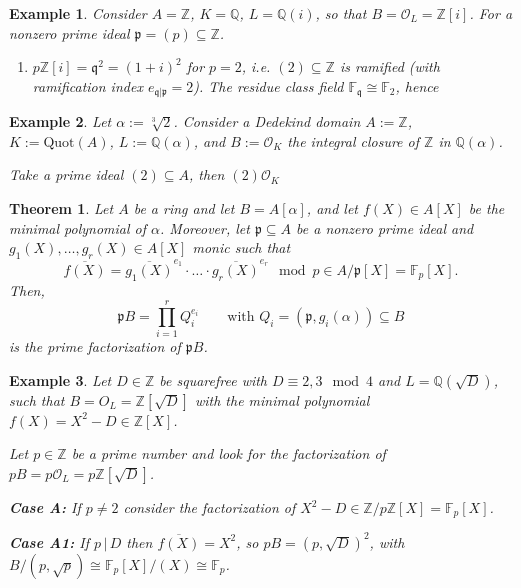 \documentclass[a4paper]{book}
\theoremstyle{break}
\newtheorem{example}{Example}
\theoremstyle{plain}
\newtheorem{theorem}{Theorem}[definition]
\begin{document}
\begin{example}
    Consider \(A = \mathbb{Z}\), \(K = \mathbb{Q}\), \(L = \mathbb{Q}(i)\), so that \(B = \mathcal{O}_L = \mathbb{Z}[i]\). For a nonzero prime ideal \(\mathfrak{p} = (p) \subseteq \mathbb{Z}\).
    \begin{enumerate}
        \item \(p \mathbb{Z}[i] = \mathfrak{q}^2 = (1 + i)^2\) for \(p = 2\), i.e. \((2) \subseteq \mathbb{Z}\) is ramified (with ramification index \(e_{\mathfrak{q} | \mathfrak{p}} = 2\)). The residue class field \(\mathbb{F}_\mathfrak{q} \cong \mathbb{F}_2\), hence
    \end{enumerate}
\end{example}

\begin{example}
    Let \(\alpha := \sqrt[3]{2}\). Consider a Dedekind domain \(A := \mathbb{Z}\), \(K := \text{Quot}(A)\), \(L := \mathbb{Q}(\alpha)\), and \(B := \mathcal{O}_K\) the integral closure of \(\mathbb{Z}\) in \(\mathbb{Q}(\alpha)\).

    Take a prime ideal \((2) \subseteq A\), then \((2) \mathcal{O}_K\)
\end{example}


\begin{theorem}
    Let \(A\) be a ring and let \(B = A[\alpha]\), and let \(f(X) \in A[X]\) be the minimal polynomial of \(\alpha\). Moreover, let \(\mathfrak{p} \subseteq A\) be a nonzero prime ideal and \(g_1(X), \ldots, g_r(X) \in A[X]\) monic such that
    \begin{equation}
        \overline{f(X)} = \overline{g_1(X)}^{e_1} \cdot \ldots \cdot \overline{g_r(X)}^{e_r} \mod{p} \in A / \mathfrak{p} [X] = \mathbb{F}_p [X] \text{.}
    \end{equation}
    Then,
    \begin{equation}
        \mathfrak{p}B = \prod_{i=1}^r Q_i^{e_i} \qquad \text{with } Q_i = (\mathfrak{p}, g_i(\alpha)) \subseteq B
    \end{equation}
    is the prime factorization of \(\mathfrak{p}B\).
\end{theorem}

\begin{example}
    Let \(D \in \mathbb{Z}\) be squarefree with \(D \equiv 2, 3 \mod{4}\) and \(L = \mathbb{Q}(\sqrt{D})\), such that \(B = O_L = \mathbb{Z}[\sqrt{D}]\) with the minimal polynomial \(f(X) = X^2 - D \in \mathbb{Z}[X]\).

    Let \(p \in \mathbb{Z}\) be a prime number and look for the factorization of \(pB = p \mathcal{O}_L = p \mathbb{Z}[\sqrt{D}]\).

    \noindent \textbf{Case A:} If \(p \neq 2\) consider the factorization of \(X^2 - D \in \mathbb{Z} / p \mathbb{Z} [X] = \mathbb{F}_p [X]\).

    \noindent \textbf{Case A1:} If \(p \, | \, D\) then \(\overline{f(X)} = X^2\), so \(pB = (p, \sqrt{D})^2\), with \(B / (p, \sqrt{p}) \cong \mathbb{F}_p[X]/(X) \cong \mathbb{F}_p\).
\end{example}
\end{document}
